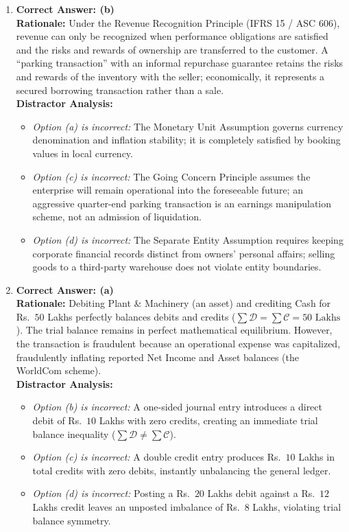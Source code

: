 \begin{enumerate}[label=\textbf{MCQ 1.\arabic*}]
    \item \textbf{Correct Answer: (b)}\\
    \textbf{Rationale:} Under the Revenue Recognition Principle (IFRS 15 / ASC 606), revenue can only be recognized when performance obligations are satisfied and the risks and rewards of ownership are transferred to the customer. A ``parking transaction'' with an informal repurchase guarantee retains the risks and rewards of the inventory with the seller; economically, it represents a secured borrowing transaction rather than a sale.\\
    \textbf{Distractor Analysis:}
    \begin{itemize}
        \item \textit{Option (a) is incorrect:} The Monetary Unit Assumption governs currency denomination and inflation stability; it is completely satisfied by booking values in local currency.
        \item \textit{Option (c) is incorrect:} The Going Concern Principle assumes the enterprise will remain operational into the foreseeable future; an aggressive quarter-end parking transaction is an earnings manipulation scheme, not an admission of liquidation.
        \item \textit{Option (d) is incorrect:} The Separate Entity Assumption requires keeping corporate financial records distinct from owners' personal affairs; selling goods to a third-party warehouse does not violate entity boundaries.
    \end{itemize}

    \item \textbf{Correct Answer: (a)}\\
    \textbf{Rationale:} Debiting Plant \& Machinery (an asset) and crediting Cash for Rs.~$50$ Lakhs perfectly balances debits and credits ($\sum \mathcal{D} = \sum \mathcal{C} = 50\text{ Lakhs}$). The trial balance remains in perfect mathematical equilibrium. However, the transaction is fraudulent because an operational expense was capitalized, fraudulently inflating reported Net Income and Asset balances (the WorldCom scheme).\\
    \textbf{Distractor Analysis:}
    \begin{itemize}
        \item \textit{Option (b) is incorrect:} A one-sided journal entry introduces a direct debit of Rs.~$10$ Lakhs with zero credits, creating an immediate trial balance inequality ($\sum \mathcal{D} \ne \sum \mathcal{C}$).
        \item \textit{Option (c) is incorrect:} A double credit entry produces Rs.~$10$ Lakhs in total credits with zero debits, instantly unbalancing the general ledger.
        \item \textit{Option (d) is incorrect:} Posting a Rs.~$20$ Lakhs debit against a Rs.~$12$ Lakhs credit leaves an unposted imbalance of Rs.~$8$ Lakhs, violating trial balance symmetry.
    \end{itemize}
\end{enumerate}

